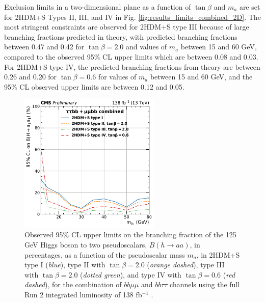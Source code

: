 Exclusion limits in a two-dimensional plane as a function of $\tan\beta$ and $m_{a}$ are set for 2HDM+S Types II, III, and IV in Fig. \ref{fig:results_limits_combined_2D}. The most stringent constraints are observed for 2HDM+S type III because of large branching fractions predicted in theory, with predicted branching fractions between 0.47 and 0.42 for $\tan\beta = 2.0$ and values of $m_{a}$ between 15 and 60 GeV, compared to the observed 95\% CL upper limits which are between 0.08 and 0.03. For 2HDM+S type IV, the predicted branching fractions from theory are between 0.26 and 0.20 for $\tan\beta = 0.6$ for values of $m_{a}$ between 15 and 60 GeV, and the 95\% CL observed upper limits are between 0.12 and 0.05.  

  \begin{figure}[h!]
    \begin{center}
      \includegraphics[width=0.6\textwidth]{figures/ch-10-results/HAA_comb_all_prelim.pdf}
    \end{center}
    \caption[Observed 95\% CL upper limits on the branching fraction of the 125 GeV Higgs boson to two pseudoscalars, $B(h\to aa)$, in percentages, as a function of the pseudoscalar mass $m_a$, in 2HDM+S type I (\textit{blue}), type II with $\tan\beta = 2.0$ (\textit{orange dashed}), type III with $\tan\beta = 2.0$ (\textit{dotted green}), and type IV with $\tan\beta = 0.6$ (\textit{red dashed}), for the combination of $bb\mu\mu$ and $bb\tau\tau$ channels using the full Run 2 integrated luminosity of 138 fb$^{-1}$.]{Observed 95\% CL upper limits on the branching fraction of the 125 GeV Higgs boson to two pseudoscalars, $B(h\to aa)$, in percentages, as a function of the pseudoscalar mass $m_a$, in 2HDM+S type I (\textit{blue}), type II with $\tan\beta = 2.0$ (\textit{orange dashed}), type III with $\tan\beta = 2.0$ (\textit{dotted green}), and type IV with $\tan\beta = 0.6$ (\textit{red dashed}), for the combination of $bb\mu\mu$ and $bb\tau\tau$ channels using the full Run 2 integrated luminosity of 138 fb$^{-1}$ \cite{CMS-AN-20-213}.}
      \label{fig:results_limits_combined}
  \end{figure}
  


